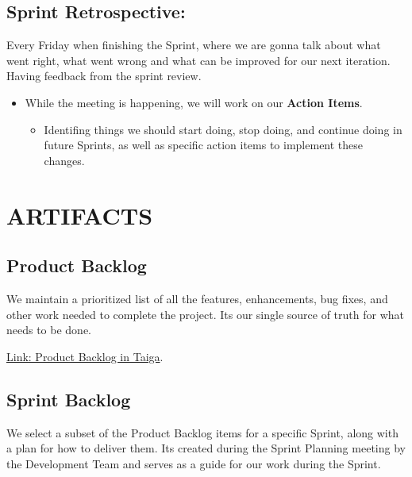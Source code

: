 \documentclass{article}
\providecommand{\tightlist}{
  \setlength{\itemsep}{0pt}\setlength{\parskip}{0pt}}
\begin{document}
\hypertarget{sprintretrospective}{
\subsection{Sprint Retrospective:}\label{sprintretrospective}}

Every Friday when finishing the Sprint, where we are gonna talk about
what went right, what went wrong and what can be improved for our next
iteration. Having feedback from the sprint review.

\begin{itemize}
\tightlist
\item
  While the meeting is happening, we will work on our \textbf{Action
  Items}.

  \begin{itemize}
  \tightlist
  \item
    Identifing things we should start doing, stop doing, and continue
    doing in future Sprints, as well as specific action items to
    implement these changes.
  \end{itemize}
\end{itemize}

\newpage

\hypertarget{artifacts}{
\section{ARTIFACTS}\label{artifacts}}

\hypertarget{productbacklog}{
\subsection{\texorpdfstring{\textbf{Product
Backlog}}{Product Backlog}}\label{productbacklog}}

We maintain a prioritized list of all the features, enhancements, bug
fixes, and other work needed to complete the project.
It\textquotesingle s our single source of truth for what needs to be
done.

\href{https://tree.taiga.io/project/joseluis-teran-coffeetime/backlog}{Link: Product Backlog in Taiga}.

\hypertarget{sprintbacklog}{
\subsection{\texorpdfstring{\textbf{Sprint
Backlog}}{Sprint Backlog}}\label{sprintbacklog}}

We select a subset of the Product Backlog items for a specific Sprint,
along with a plan for how to deliver them. It\textquotesingle s created
during the Sprint Planning meeting by the Development Team and serves as
a guide for our work during the Sprint.
\end{document}
